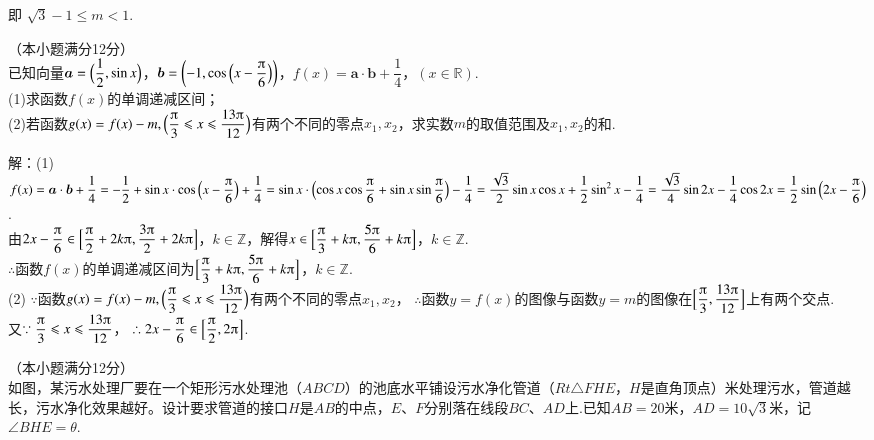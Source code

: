 \begin{exercise}
\begin{answer}
        即 $\sqrt3-1\leqslant m<1$.
      \end{answer}
    \vspace{3.6cm}
    \item
      （本小题满分12分）\\
      已知向量$\bm a=\Bigl(\dfrac{1}2,\sin x\Bigr)$，$\bm b=\biggl(-1,\cos{\Bigl(x-\dfrac{\piup}6\Bigr)}\biggr)$，$f(x)=\bm a\cdot\bm b+\dfrac{1}4$，$(x\in\mathbb{R})$.\\
      (1)求函数$f(x)$的单调递减区间；\\
      (2)若函数$g(x)=f(x)-m,\Bigl(\dfrac{\piup}3\leqslant x\leqslant\dfrac{13\piup}{12}\Bigr)$有两个不同的零点$x_1,x_2$，求实数$m$的取值范围及$x_1,x_2$的和.\\
      \begin{answer}
        解：(1)$f(x)=\bm a\cdot\bm b+\dfrac{1}4
        =-\dfrac12+\sin{x}\cdot\cos{\Bigl(x-\dfrac{\piup}6\Bigr)}+\dfrac14
        =\sin{x}\cdot \Bigl(\cos x\cos{\dfrac{\piup}6}+\sin x\sin{\dfrac{\piup}6}\Bigr)-\dfrac14
        =\dfrac{\sqrt3}2\sin x\cos x+\dfrac12\sin^2x-\dfrac14
        =\dfrac{\sqrt3}4\sin{2x}-\dfrac14\cos{2x}
        =\dfrac12\sin{\Bigl(2x-\dfrac{\piup}6\Bigr)}$.\\
        由$2x-\dfrac{\piup}6\in\Bigl[\dfrac{\piup}2+2k\piup,\dfrac{3\piup}2+2k\piup\Bigr]$，${k\in\mathbb{Z}}$，解得$x\in\Bigl[\dfrac{\piup}3+k\piup,\dfrac{5\piup}6+k\piup\Bigr]$，${k\in\mathbb{Z}}$.\\
        $\therefore$函数$f(x)$的单调递减区间为$\Bigl[\dfrac{\piup}3+k\piup,\dfrac{5\piup}6+k\piup\Bigr]$，${k\in\mathbb{Z}}$.\\
        (2) $\because$函数$g(x)=f(x)-m,\Bigl(\dfrac{\piup}3\leqslant x\leqslant\dfrac{13\piup}{12}\Bigr)$有两个不同的零点$x_1,x_2$，
        $\therefore$函数$y=f(x)$的图像与函数$y=m$的图像在$\Bigl[\dfrac{\piup}3,\dfrac{13\piup}{12}\Bigr]$上有两个交点.\\
        又$\because \dfrac{\piup}3\leqslant x\leqslant\dfrac{13\piup}{12}$，
        $\therefore 2x-\dfrac{\piup}6\in\Bigl[\dfrac{\piup}2,2\piup\Bigr]$.
      \end{answer}
    \vspace{4cm}
    \item
      （本小题满分12分）\\
      如图，某污水处理厂要在一个矩形污水处理池（$ABCD$）的池底水平铺设污水净化管道（$Rt\triangle{FHE}$，$H$是直角顶点）米处理污水，管道越长，污水净化效果越好。设计要求管道的接口$H$是$AB$的中点，$E$、$F$分别落在线段$BC$、$AD$上.已知$AB=20$米，$AD=10\sqrt3$米，记$\angle{BHE}=\theta$.\\

\end{exercise}
